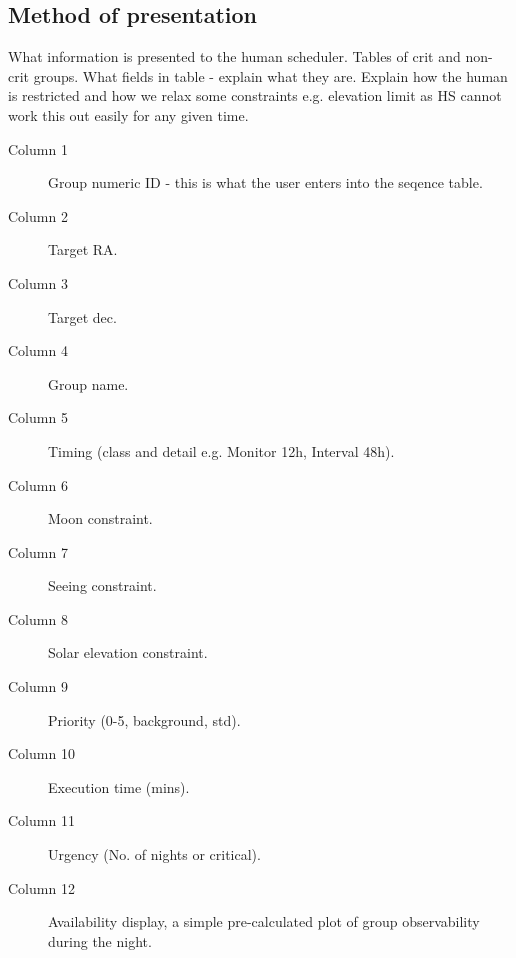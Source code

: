 \subsection{Method of presentation}
What information is presented to the human scheduler.
Tables of crit and non-crit groups. What fields in table - explain what they are.
Explain how the human is restricted and how we relax some constraints e.g. elevation limit as HS cannot work this out easily for any given time.

\begin{description}
\item[Column  1] Group numeric ID - this is what the user enters into the seqence table.
\item[Column  2] Target RA.
\item[Column  3] Target dec.
\item[Column  4] Group name.
\item[Column  5] Timing (class and detail e.g. Monitor 12h, Interval 48h).
\item[Column  6] Moon constraint.
\item[Column  7] Seeing constraint.
\item[Column  8] Solar elevation constraint.
\item[Column  9] Priority (0-5, background, std).
\item[Column 10] Execution time (mins).
\item[Column 11] Urgency (No. of nights or critical).
\item[Column 12] Availability display, a simple pre-calculated plot of group observability during the night. 
\end{description}

\clearpage


